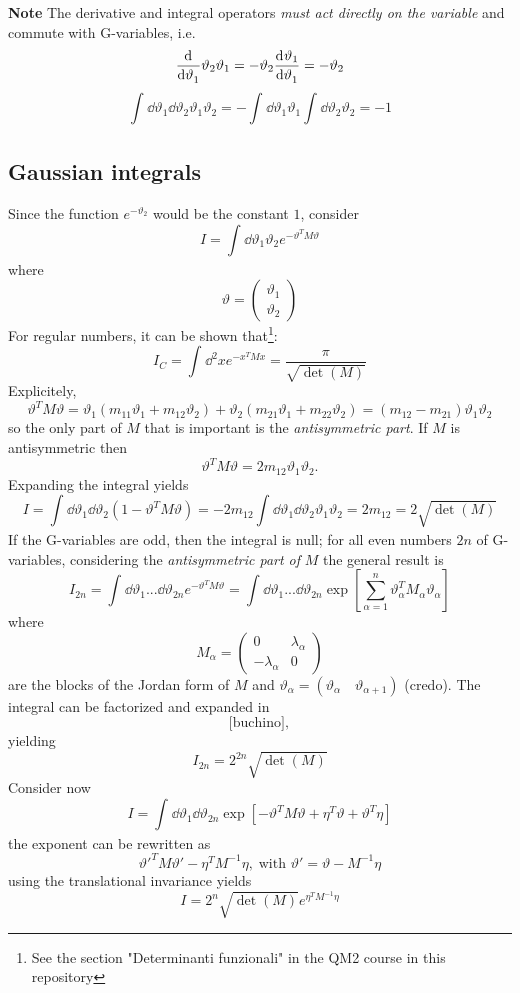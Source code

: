 \textbf{Note} The derivative and integral operators \textit{must act directly
on the variable} and commute with G-variables, i.e.
\[
    \dv[]{}{\vartheta_1}\vartheta_2\vartheta_1 = -\vartheta_2\dv[]
    {\vartheta _1}{\vartheta _1} = -\vartheta_2
\]
\[
    \int_{}^{} \dd \vartheta_1\dd\vartheta_2 \vartheta_1\vartheta_2 = 
    -\int_{}^{} \dd\vartheta_1\vartheta_1\int_{}^{} \dd \vartheta_2\vartheta_2 =-1
\]
\subsection{Gaussian integrals}
Since the function $e^{-\vartheta_2}$ would be the constant $1$, consider
\[
    I=\int_{}^{} \dd \vartheta_1\vartheta_2 e^{-\vartheta^TM\vartheta}
\]
where
\[
    \vartheta = \begin{pmatrix*}
    \vartheta_1\\\vartheta_2
    \end{pmatrix*}
\]
For regular numbers, it can be shown that\footnote{See the section "Determinanti
    funzionali" in the QM2 course in this repository}:
\[
    I_C = \int_{}^{} \dd^2x e^{-x^TMx} = \frac{\pi}{\sqrt{\det(M)}}
\]
Explicitely,
\[
    \vartheta^TM\vartheta = \vartheta_1(m_{11}\vartheta _1+m_{12}\vartheta_2)+
    \vartheta_2(m_{21}\vartheta_1+m_{22}\vartheta_2)=(m_{12}-m_{21})\vartheta_1
    \vartheta_2
\]
so the only part of $M$ that is important is the \textit{antisymmetric part}.
If $M$ is antisymmetric then
\[
    \vartheta^TM\vartheta = 2m_{12}\vartheta_1\vartheta_2.
\]
Expanding the integral yields
\[
    I=\int_{}^{} \dd\vartheta_1\dd\vartheta_2 (1-\vartheta^TM\vartheta)=
    -2m_{12}\int_{}^{} \dd\vartheta_1\dd\vartheta_2\vartheta_1\vartheta_2=2m_{12}=
    2\sqrt{\det(M)}
\]
If the G-variables are odd, then the integral is null; for all even numbers
$2n$ of G-variables, considering the \textit{antisymmetric part of} $M$ the
general result is
\[
    I_{2n}=\int_{}^{} \dd\vartheta_1...\dd\vartheta_{2n} e^{-\vartheta^TM\vartheta} = 
    \int_{}^{} \dd \vartheta_1...\dd\vartheta_{2n} \exp\left[ \sum_{\alpha=1}^{n}
    \vartheta_\alpha^TM_\alpha \vartheta_\alpha\right]
\]
where\[
    M_\alpha  = \begin{pmatrix}
        0&\lambda_\alpha\\
        -\lambda_\alpha&0
    \end{pmatrix}
\] 
are the blocks of the Jordan form of $M$ and $\vartheta_\alpha =
(\vartheta_\alpha\quad\vartheta_{\alpha+1})$ (credo).
The integral can be factorized and expanded in
\[
    \text{[buchino]},
\] yielding
\[
    I_{2n} =2^{2n}\sqrt{\det(M)}
\]
Consider now
\[
    I = \int_{}^{} \dd \vartheta_1\dd\vartheta_{2n}
    \exp\left[ -\vartheta^TM\vartheta+\eta^T\vartheta+\vartheta^T\eta\right]
\]
the exponent can be rewritten as 
\[
    \vartheta'^TM\vartheta' - \eta^TM^{-1}\eta,\;\text{with }
    \vartheta' = \vartheta-M^{-1}\eta
\]
using the translational invariance yields
\[
    I=2^n\sqrt{\det(M)}e^{\eta^TM^{-1}\eta }
\]
